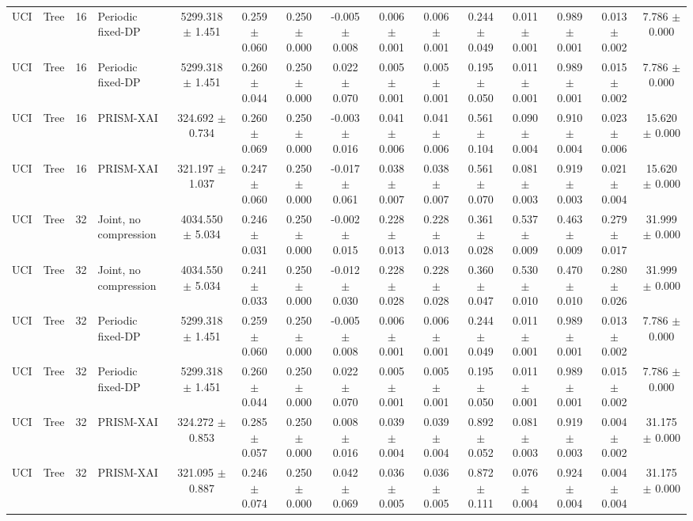 \begin{tabular}{llllccccccccccc}
UCI & Tree & 16 & Periodic fixed-DP & 5299.318 $\pm$ 1.451 & 0.259 $\pm$ 0.060 & 0.250 $\pm$ 0.000 & -0.005 $\pm$ 0.008 & 0.006 $\pm$ 0.001 & 0.006 $\pm$ 0.001 & 0.244 $\pm$ 0.049 & 0.011 $\pm$ 0.001 & 0.989 $\pm$ 0.001 & 0.013 $\pm$ 0.002 & 7.786 $\pm$ 0.000 \\
UCI & Tree & 16 & Periodic fixed-DP & 5299.318 $\pm$ 1.451 & 0.260 $\pm$ 0.044 & 0.250 $\pm$ 0.000 & 0.022 $\pm$ 0.070 & 0.005 $\pm$ 0.001 & 0.005 $\pm$ 0.001 & 0.195 $\pm$ 0.050 & 0.011 $\pm$ 0.001 & 0.989 $\pm$ 0.001 & 0.015 $\pm$ 0.002 & 7.786 $\pm$ 0.000 \\
UCI & Tree & 16 & PRISM-XAI & 324.692 $\pm$ 0.734 & 0.260 $\pm$ 0.069 & 0.250 $\pm$ 0.000 & -0.003 $\pm$ 0.016 & 0.041 $\pm$ 0.006 & 0.041 $\pm$ 0.006 & 0.561 $\pm$ 0.104 & 0.090 $\pm$ 0.004 & 0.910 $\pm$ 0.004 & 0.023 $\pm$ 0.006 & 15.620 $\pm$ 0.000 \\
UCI & Tree & 16 & PRISM-XAI & 321.197 $\pm$ 1.037 & 0.247 $\pm$ 0.060 & 0.250 $\pm$ 0.000 & -0.017 $\pm$ 0.061 & 0.038 $\pm$ 0.007 & 0.038 $\pm$ 0.007 & 0.561 $\pm$ 0.070 & 0.081 $\pm$ 0.003 & 0.919 $\pm$ 0.003 & 0.021 $\pm$ 0.004 & 15.620 $\pm$ 0.000 \\
UCI & Tree & 32 & Joint, no compression & 4034.550 $\pm$ 5.034 & 0.246 $\pm$ 0.031 & 0.250 $\pm$ 0.000 & -0.002 $\pm$ 0.015 & 0.228 $\pm$ 0.013 & 0.228 $\pm$ 0.013 & 0.361 $\pm$ 0.028 & 0.537 $\pm$ 0.009 & 0.463 $\pm$ 0.009 & 0.279 $\pm$ 0.017 & 31.999 $\pm$ 0.000 \\
UCI & Tree & 32 & Joint, no compression & 4034.550 $\pm$ 5.034 & 0.241 $\pm$ 0.033 & 0.250 $\pm$ 0.000 & -0.012 $\pm$ 0.030 & 0.228 $\pm$ 0.028 & 0.228 $\pm$ 0.028 & 0.360 $\pm$ 0.047 & 0.530 $\pm$ 0.010 & 0.470 $\pm$ 0.010 & 0.280 $\pm$ 0.026 & 31.999 $\pm$ 0.000 \\
UCI & Tree & 32 & Periodic fixed-DP & 5299.318 $\pm$ 1.451 & 0.259 $\pm$ 0.060 & 0.250 $\pm$ 0.000 & -0.005 $\pm$ 0.008 & 0.006 $\pm$ 0.001 & 0.006 $\pm$ 0.001 & 0.244 $\pm$ 0.049 & 0.011 $\pm$ 0.001 & 0.989 $\pm$ 0.001 & 0.013 $\pm$ 0.002 & 7.786 $\pm$ 0.000 \\
UCI & Tree & 32 & Periodic fixed-DP & 5299.318 $\pm$ 1.451 & 0.260 $\pm$ 0.044 & 0.250 $\pm$ 0.000 & 0.022 $\pm$ 0.070 & 0.005 $\pm$ 0.001 & 0.005 $\pm$ 0.001 & 0.195 $\pm$ 0.050 & 0.011 $\pm$ 0.001 & 0.989 $\pm$ 0.001 & 0.015 $\pm$ 0.002 & 7.786 $\pm$ 0.000 \\
UCI & Tree & 32 & PRISM-XAI & 324.272 $\pm$ 0.853 & 0.285 $\pm$ 0.057 & 0.250 $\pm$ 0.000 & 0.008 $\pm$ 0.016 & 0.039 $\pm$ 0.004 & 0.039 $\pm$ 0.004 & 0.892 $\pm$ 0.052 & 0.081 $\pm$ 0.003 & 0.919 $\pm$ 0.003 & 0.004 $\pm$ 0.002 & 31.175 $\pm$ 0.000 \\
UCI & Tree & 32 & PRISM-XAI & 321.095 $\pm$ 0.887 & 0.246 $\pm$ 0.074 & 0.250 $\pm$ 0.000 & 0.042 $\pm$ 0.069 & 0.036 $\pm$ 0.005 & 0.036 $\pm$ 0.005 & 0.872 $\pm$ 0.111 & 0.076 $\pm$ 0.004 & 0.924 $\pm$ 0.004 & 0.004 $\pm$ 0.004 & 31.175 $\pm$ 0.000 \\
\bottomrule
\end{tabular}
